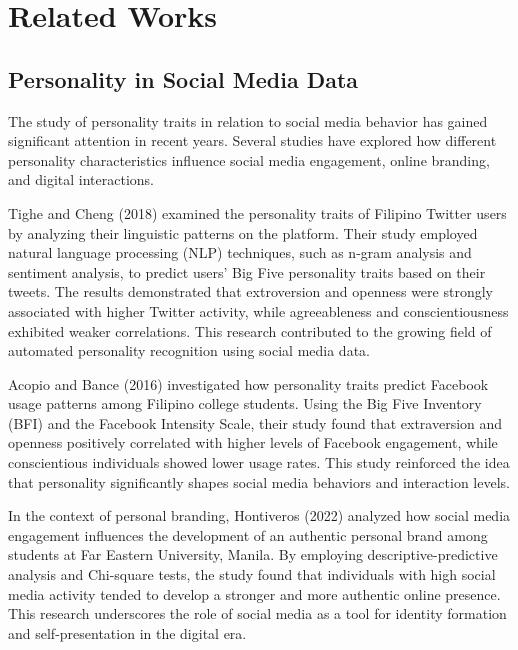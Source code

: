 %
%
%                 

\chapter{Related Works}
\label{sec:Related Works}

\section{Personality in Social Media Data}
\label{sec:Personality}
The study of personality traits in relation to social media behavior has gained significant attention in recent years. Several studies have explored how different personality characteristics influence social media engagement, online branding, and digital interactions.

Tighe and Cheng (2018) examined the personality traits of Filipino Twitter users by analyzing their linguistic patterns on the platform. Their study employed natural language processing (NLP) techniques, such as n-gram analysis and sentiment analysis, to predict users' Big Five personality traits based on their tweets. The results demonstrated that extroversion and openness were strongly associated with higher Twitter activity, while agreeableness and conscientiousness exhibited weaker correlations. This research contributed to the growing field of automated personality recognition using social media data.

Acopio and Bance (2016) investigated how personality traits predict Facebook usage patterns among Filipino college students. Using the Big Five Inventory (BFI) and the Facebook Intensity Scale, their study found that extraversion and openness positively correlated with higher levels of Facebook engagement, while conscientious individuals showed lower usage rates. This study reinforced the idea that personality significantly shapes social media behaviors and interaction levels.

In the context of personal branding, Hontiveros (2022) analyzed how social media engagement influences the development of an authentic personal brand among students at Far Eastern University, Manila. By employing descriptive-predictive analysis and Chi-square tests, the study found that individuals with high social media activity tended to develop a stronger and more authentic online presence. This research underscores the role of social media as a tool for identity formation and self-presentation in the digital era.

